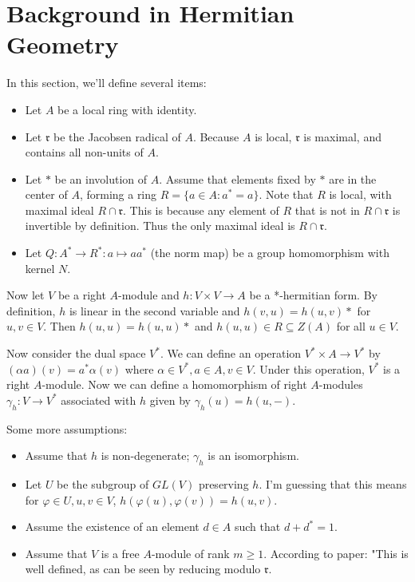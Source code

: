 \documentclass[11pt]{article}
\begin{document}
\section{Background in Hermitian Geometry}

In this section, we'll define several items:
\begin{itemize}
\item Let $A$ be a local ring with identity.
\item Let $\mathfrak{r}$ be the Jacobsen radical of $A$. Because $A$ is local, $\mathfrak{r}$ is maximal, and contains all non-units of $A$.
\item Let $*$ be an involution of $A$. Assume that elements fixed by $*$ are in the center of $A$, forming a ring $R = \{a \in A: a^* = a\}$.
Note that $R$ is local, with maximal ideal $R \cap \mathfrak{r}$. This is because any element of $R$ that is not in $R \cap \mathfrak{r}$ is invertible by definition.
Thus the only maximal ideal is $R \cap \mathfrak{r}$.
\item Let $Q: A^* \to R^*: a \mapsto aa^*$ (the norm map) be a group homomorphism with kernel $N$.
\end{itemize}

Now let $V$ be a right $A$-module and $h: V \times V \to A$ be a *-hermitian form.
By definition, $h$ is linear in the second variable and $h(v, u) = h(u, v)*$ for $u, v \in V$.
Then $h(u,u) = h(u,u)*$ and $h(u,u) \in R \subseteq Z(A)$ for all $u \in V$.

Now consider the dual space $V^*$. We can define an operation $V^* \times A \to V^*$ by $(\alpha a)(v) = a^* \alpha(v)$ where $\alpha \in V^*, a \in A, v \in V$.
Under this operation, $V^*$ is a right $A$-module.
Now we can define a homomorphism of right $A$-modules $\gamma_h: V \to V^*$ associated with $h$ given by $\gamma_h(u) = h(u, -)$.


Some more assumptions:

\begin{itemize}
\item Assume that $h$ is non-degenerate; $\gamma_h$ is an isomorphism.
\item Let $U$ be the subgroup of $GL(V)$ preserving $h$. I'm guessing that this means for $\varphi \in U, u,v \in V$, $h(\varphi(u), \varphi(v)) = h(u,v)$.
\item Assume the existence of an element $d \in A$ such that $d + d^* = 1$.
\item Assume that $V$ is a free $A$-module of rank $m \ge 1$. According to paper: "This is well defined, as can be seen by reducing modulo $\mathfrak{r}$.
\end{itemize}
\end{document}
